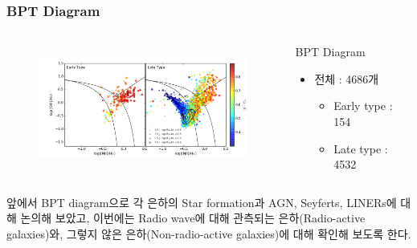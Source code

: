 \documentclass[xcolor={dvipsnames,table}]{beamer}
\newcommand\SM{\fontsize{8}{7.2}\selectfont}
\begin{document}
\begin{frame}
  \frametitle{BPT Diagram}
  \SM
  \begin{columns}
   \begin{figure}
    \centering
    \includegraphics[width=7cm, height=4cm]{BPT.png}
   \end{figure}
   \centering
   \begin{block}{BPT Diagram}
    \begin{itemize}
     \item 전체 : 4686개
     \begin{itemize}
      \item Early type : 154
      \item Late type : 4532
     \end{itemize}
    \end{itemize}
   \end{block}
  \end{columns}
  \vspace{0.2cm}
  앞에서 BPT diagram으로 각 은하의 Star formation과 AGN, Seyferts, LINERs에 대해 논의해 보았고, 이번에는 Radio wave에 대해
  관측되는 은하(Radio-active galaxies)와, 그렇지 않은 은하(Non-radio-active galaxies)에 대해 확인해 보도록 한다.
\end{frame}
\end{document}
